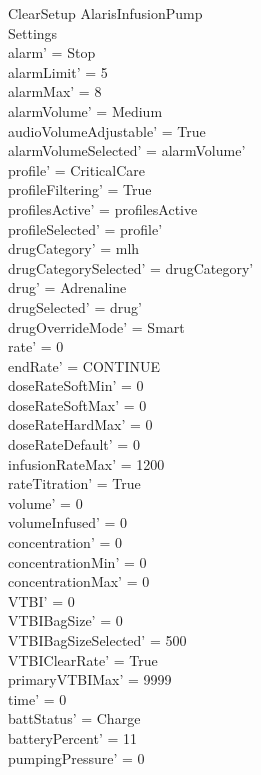 \begin{schema}{ClearSetup}
	\Delta AlarisInfusionPump\\
	\Delta Settings\\
	\where
	alarm' = Stop\\
	alarmLimit' = 5\\
	alarmMax' = 8\\
	alarmVolume' = Medium\\
	audioVolumeAdjustable' = True\\
	alarmVolumeSelected' = alarmVolume'\\
	profile' = CriticalCare\\
	profileFiltering' = True\\
	profilesActive' = profilesActive\\  
	profileSelected' = profile'\\
	drugCategory' = mlh\\
	drugCategorySelected' = drugCategory'\\
	drug' = Adrenaline\\
	drugSelected' = drug'\\
	drugOverrideMode' = Smart\\
	rate' = 0\\
	endRate' = CONTINUE\\
	doseRateSoftMin' = 0\\
	doseRateSoftMax' = 0\\
	doseRateHardMax' = 0\\
	doseRateDefault' = 0\\
	infusionRateMax' = 1200\\
	rateTitration' = True\\
	\pagebreak
	volume' = 0\\
	volumeInfused' = 0\\
	concentration' = 0\\
	concentrationMin' = 0\\
	concentrationMax' = 0\\
	VTBI' = 0\\
	VTBIBagSize' = 0\\
	VTBIBagSizeSelected' = 500\\
	VTBIClearRate' = True\\
	primaryVTBIMax' = 9999\\
	time' = 0\\
	battStatus' = Charge\\
	batteryPercent' = 11\\
	pumpingPressure' = 0\\

\end{schema}
